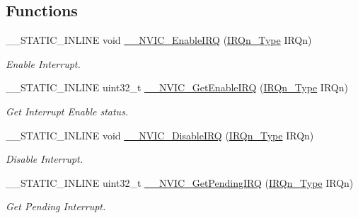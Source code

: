 \subsection*{Functions}
\begin{DoxyCompactItemize}
\item 
\+\_\+\+\_\+\+S\+T\+A\+T\+I\+C\+\_\+\+I\+N\+L\+I\+NE void \hyperlink{group___c_m_s_i_s___core___n_v_i_c_functions_ga71227e1376cde11eda03fcb62f1b33ea}{\+\_\+\+\_\+\+N\+V\+I\+C\+\_\+\+Enable\+I\+RQ} (\hyperlink{group___peripheral__interrupt__number__definition_ga7e1129cd8a196f4284d41db3e82ad5c8}{I\+R\+Qn\+\_\+\+Type} I\+R\+Qn)
\begin{DoxyCompactList}\small\item\em Enable Interrupt. \end{DoxyCompactList}\item 
\+\_\+\+\_\+\+S\+T\+A\+T\+I\+C\+\_\+\+I\+N\+L\+I\+NE uint32\+\_\+t \hyperlink{group___c_m_s_i_s___core___n_v_i_c_functions_gaaeb5e7cc0eaad4e2817272e7bf742083}{\+\_\+\+\_\+\+N\+V\+I\+C\+\_\+\+Get\+Enable\+I\+RQ} (\hyperlink{group___peripheral__interrupt__number__definition_ga7e1129cd8a196f4284d41db3e82ad5c8}{I\+R\+Qn\+\_\+\+Type} I\+R\+Qn)
\begin{DoxyCompactList}\small\item\em Get Interrupt Enable status. \end{DoxyCompactList}\item 
\+\_\+\+\_\+\+S\+T\+A\+T\+I\+C\+\_\+\+I\+N\+L\+I\+NE void \hyperlink{group___c_m_s_i_s___core___n_v_i_c_functions_gae016e4c1986312044ee768806537d52f}{\+\_\+\+\_\+\+N\+V\+I\+C\+\_\+\+Disable\+I\+RQ} (\hyperlink{group___peripheral__interrupt__number__definition_ga7e1129cd8a196f4284d41db3e82ad5c8}{I\+R\+Qn\+\_\+\+Type} I\+R\+Qn)
\begin{DoxyCompactList}\small\item\em Disable Interrupt. \end{DoxyCompactList}\item 
\+\_\+\+\_\+\+S\+T\+A\+T\+I\+C\+\_\+\+I\+N\+L\+I\+NE uint32\+\_\+t \hyperlink{group___c_m_s_i_s___core___n_v_i_c_functions_ga5a92ca5fa801ad7adb92be7257ab9694}{\+\_\+\+\_\+\+N\+V\+I\+C\+\_\+\+Get\+Pending\+I\+RQ} (\hyperlink{group___peripheral__interrupt__number__definition_ga7e1129cd8a196f4284d41db3e82ad5c8}{I\+R\+Qn\+\_\+\+Type} I\+R\+Qn)
\begin{DoxyCompactList}\small\item\em Get Pending Interrupt. \end{DoxyCompactList}\item 

\end{DoxyCompactItemize}
